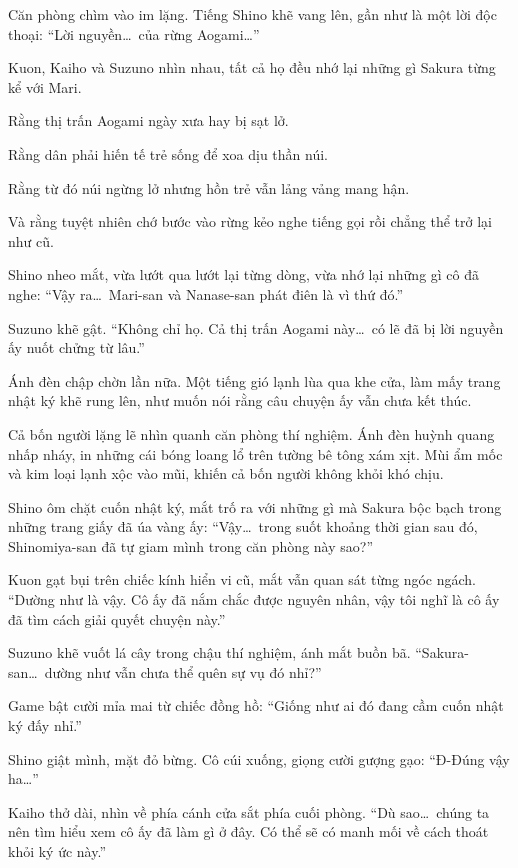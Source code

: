 \documentclass[../main.tex]{subfiles}
\begin{document}
Căn phòng chìm vào im lặng. Tiếng Shino khẽ vang lên, gần như là một lời độc thoại: ``Lời nguyền\dots\ của rừng Aogami\dots''

Kuon, Kaiho và Suzuno nhìn nhau, tất cả họ đều nhớ lại những gì Sakura từng kể với Mari.

Rằng thị trấn Aogami ngày xưa hay bị sạt lở.

Rằng dân phải hiến tế trẻ sống để xoa dịu thần núi.

Rằng từ đó núi ngừng lở nhưng hồn trẻ vẫn lảng vảng mang hận.

Và rằng tuyệt nhiên chớ bước vào rừng kẻo nghe tiếng gọi rồi chẳng thể trở lại như cũ.

Shino nheo mắt, vừa lướt qua lướt lại từng dòng, vừa nhớ lại những gì cô đã nghe: ``Vậy ra\dots\ Mari-san và Nanase-san phát điên là vì thứ đó.''

Suzuno khẽ gật. ``Không chỉ họ. Cả thị trấn Aogami này\dots\ có lẽ đã bị lời nguyền ấy nuốt chửng từ lâu.''

Ánh đèn chập chờn lần nữa. Một tiếng gió lạnh lùa qua khe cửa, làm mấy trang nhật ký khẽ rung lên, như muốn nói rằng câu chuyện ấy vẫn chưa kết thúc.

Cả bốn người lặng lẽ nhìn quanh căn phòng thí nghiệm. Ánh đèn huỳnh quang nhấp nháy, in những cái bóng loang lổ trên tường bê tông xám xịt. Mùi ẩm mốc và kim loại lạnh xộc vào mũi, khiến cả bốn người không khỏi khó chịu.

Shino ôm chặt cuốn nhật ký, mắt trố ra với những gì mà Sakura bộc bạch trong những trang giấy đã úa vàng ấy: ``Vậy\dots\ trong suốt khoảng thời gian sau đó, Shinomiya-san đã tự giam mình trong căn phòng này sao?''


Kuon gạt bụi trên chiếc kính hiển vi cũ, mắt vẫn quan sát từng ngóc ngách. ``Dường như là vậy. Cô ấy đã nắm chắc được nguyên nhân, vậy tôi nghĩ là cô ấy đã tìm cách giải quyết chuyện này.''

Suzuno khẽ vuốt lá cây trong chậu thí nghiệm, ánh mắt buồn bã. ``Sakura-san\dots\ dường như vẫn chưa thể quên sự vụ đó nhỉ?''

Game bật cười mỉa mai từ chiếc đồng hồ: ``Giống như ai đó đang cầm cuốn nhật ký đấy nhỉ.''

Shino giật mình, mặt đỏ bừng. Cô cúi xuống, giọng cười gượng gạo: ``Đ-Đúng vậy ha\dots''

Kaiho thở dài, nhìn về phía cánh cửa sắt phía cuối phòng. ``Dù sao\dots\ chúng ta nên tìm hiểu xem cô ấy đã làm gì ở đây. Có thể sẽ có manh mối về cách thoát khỏi ký ức này.''
\end{document}
